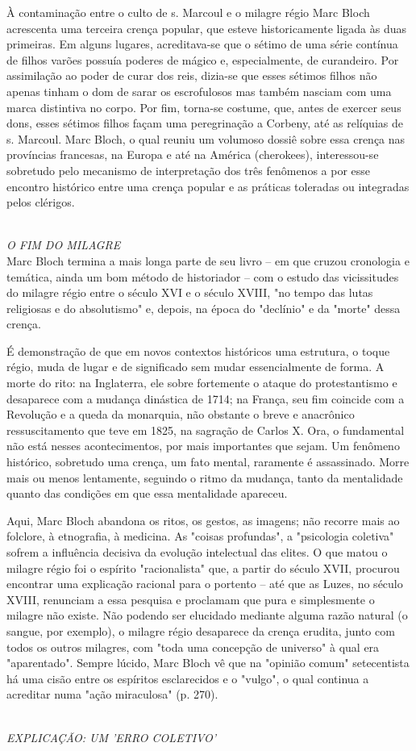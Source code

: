 \documentclass[a5paper]{book}
\begin{document}
À contaminação entre o culto de s. Marcoul e o milagre régio Marc Bloch acrescenta uma terceira crença popular, que esteve historicamente ligada às duas primeiras. Em alguns lugares, acreditava-se que o sétimo de uma série contínua de f{\kern0pt}ilhos varões possuía poderes de mágico e, especialmente, de curandeiro. Por assimilação ao poder de curar dos reis, dizia-se que esses sétimos f{\kern0pt}ilhos não apenas tinham o dom de sarar os escrofulosos mas também nasciam com uma marca distintiva no corpo. Por f{\kern0pt}im, torna-se costume, que, antes de exercer seus dons, esses sétimos f{\kern0pt}ilhos façam uma peregrinação a Corbeny, até as relíquias de s. Marcoul. Marc Bloch, o qual reuniu um volumoso dossiê sobre essa crença nas províncias francesas, na Europa e até na América (cherokees), interessou-se sobretudo pelo mecanismo de interpretação dos três fenômenos a por esse encontro histórico entre uma crença popular e as práticas toleradas ou integradas pelos clérigos.

~\\ \large \textit{O FIM DO MILAGRE} ~\\

Marc Bloch termina a mais longa parte de seu livro -- em que cruzou cronologia e temática, ainda um bom método de historiador -- com o estudo das vicissitudes do milagre régio entre o século XVI e o século XVIII, "no tempo das lutas religiosas e do absolutismo" e, depois, na época do "declínio" e da "morte" dessa crença.

É demonstração de que em novos contextos históricos uma estrutura, o toque régio, muda de lugar e de signif{\kern0pt}icado sem mudar essencialmente de forma. A morte do rito: na Inglaterra, ele sobre fortemente o ataque do protestantismo e desaparece com a mudança dinástica de 1714; na França, seu f{\kern0pt}im coincide com a Revolução e a queda da monarquia, não obstante o breve e anacrônico ressuscitamento que teve em 1825, na sagração de Carlos X. Ora, o fundamental não está nesses acontecimentos, por mais importantes que sejam. Um fenômeno histórico, sobretudo uma crença, um fato mental, raramente é assassinado. Morre mais ou menos lentamente, seguindo o ritmo da mudança, tanto da mentalidade quanto das condições em que essa mentalidade apareceu.

Aqui, Marc Bloch abandona os ritos, os gestos, as imagens; não recorre mais ao folclore, à etnograf{\kern0pt}ia, à medicina. As "coisas profundas", a "psicologia coletiva" sofrem a inf{\kern0pt}luência decisiva da evolução intelectual das elites. O que matou o milagre régio foi o espírito "racionalista"{ }que, a partir do século XVII, procurou encontrar uma explicação racional para o portento -- até que as Luzes, no século XVIII, renunciam a essa pesquisa e proclamam que pura e simplesmente o milagre não existe. Não podendo ser elucidado mediante alguma razão natural (o sangue, por exemplo), o milagre régio desaparece da crença erudita, junto com todos os outros milagres, com "toda uma concepção de universo"{ }à qual era "aparentado". Sempre lúcido, Marc Bloch vê que na "opinião comum"{ }setecentista há uma cisão entre os espíritos esclarecidos e o "vulgo", o qual continua a acreditar numa "ação miraculosa" (p. 270).

~\\ \large \textit{EXPLICAÇÃO: UM 'ERRO COLETIVO'} ~\\
\end{document}
